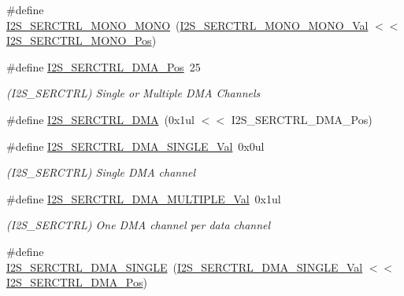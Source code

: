 \begin{DoxyCompactItemize}
\item 
\#define \mbox{\hyperlink{group___s_a_m_d21___i2_s_ga913c0c5d3fde877d1e486b95e70c90f1}{I2\+S\+\_\+\+S\+E\+R\+C\+T\+R\+L\+\_\+\+M\+O\+N\+O\+\_\+\+M\+O\+NO}}~(\mbox{\hyperlink{group___s_a_m_d21___i2_s_gab493924b2b9c0bbbb02a4607d2a3c891}{I2\+S\+\_\+\+S\+E\+R\+C\+T\+R\+L\+\_\+\+M\+O\+N\+O\+\_\+\+M\+O\+N\+O\+\_\+\+Val}}     $<$$<$ \mbox{\hyperlink{group___s_a_m_d21___i2_s_ga5fc00eb2e108b61763826073051c5659}{I2\+S\+\_\+\+S\+E\+R\+C\+T\+R\+L\+\_\+\+M\+O\+N\+O\+\_\+\+Pos}})
\item 
\#define \mbox{\hyperlink{group___s_a_m_d21___i2_s_ga8165cc61f552d261ed48aaaa01cec6db}{I2\+S\+\_\+\+S\+E\+R\+C\+T\+R\+L\+\_\+\+D\+M\+A\+\_\+\+Pos}}~25
\begin{DoxyCompactList}\small\item\em (I2\+S\+\_\+\+S\+E\+R\+C\+T\+RL) Single or Multiple D\+MA Channels \end{DoxyCompactList}\item 
\#define \mbox{\hyperlink{group___s_a_m_d21___i2_s_gaa02611ddc5f37cbb1240a8a453b6f050}{I2\+S\+\_\+\+S\+E\+R\+C\+T\+R\+L\+\_\+\+D\+MA}}~(0x1ul $<$$<$ I2\+S\+\_\+\+S\+E\+R\+C\+T\+R\+L\+\_\+\+D\+M\+A\+\_\+\+Pos)
\item 
\#define \mbox{\hyperlink{group___s_a_m_d21___i2_s_gabbc2d7125773122416a6de6141b1aa4f}{I2\+S\+\_\+\+S\+E\+R\+C\+T\+R\+L\+\_\+\+D\+M\+A\+\_\+\+S\+I\+N\+G\+L\+E\+\_\+\+Val}}~0x0ul
\begin{DoxyCompactList}\small\item\em (I2\+S\+\_\+\+S\+E\+R\+C\+T\+RL) Single D\+MA channel \end{DoxyCompactList}\item 
\#define \mbox{\hyperlink{group___s_a_m_d21___i2_s_ga3a6cd6d803a19fe1fdf205e7cc053d18}{I2\+S\+\_\+\+S\+E\+R\+C\+T\+R\+L\+\_\+\+D\+M\+A\+\_\+\+M\+U\+L\+T\+I\+P\+L\+E\+\_\+\+Val}}~0x1ul
\begin{DoxyCompactList}\small\item\em (I2\+S\+\_\+\+S\+E\+R\+C\+T\+RL) One D\+MA channel per data channel \end{DoxyCompactList}\item 
\#define \mbox{\hyperlink{group___s_a_m_d21___i2_s_ga0d648109d867d54880a88051980966fc}{I2\+S\+\_\+\+S\+E\+R\+C\+T\+R\+L\+\_\+\+D\+M\+A\+\_\+\+S\+I\+N\+G\+LE}}~(\mbox{\hyperlink{group___s_a_m_d21___i2_s_gabbc2d7125773122416a6de6141b1aa4f}{I2\+S\+\_\+\+S\+E\+R\+C\+T\+R\+L\+\_\+\+D\+M\+A\+\_\+\+S\+I\+N\+G\+L\+E\+\_\+\+Val}}    $<$$<$ \mbox{\hyperlink{group___s_a_m_d21___i2_s_ga8165cc61f552d261ed48aaaa01cec6db}{I2\+S\+\_\+\+S\+E\+R\+C\+T\+R\+L\+\_\+\+D\+M\+A\+\_\+\+Pos}})
$$
\end{DoxyCompactItemize}
